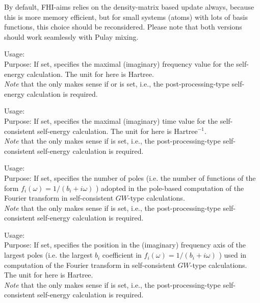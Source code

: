 By default, FHI-aims relies on the density-matrix based update always, because
this is more memory efficient, but for small systems (atoms) with lots of
basis functions, this choice should be reconsidered.  Please note that both
versions should work seamlessly with Pulay mixing.


{ \noindent
  Usage:   \\[1.0ex]
  Purpose: If set, specifies the maximal (imaginary) frequency value for the 
  self-energy calculation.  The unit for  here is Hartree.\\[1.0ex]  
}
\emph{Note} that the  only makes sense if 
 or  is set, i.e., the post-processing-type self-energy calculation 
is required.

{ \noindent
  Usage:   \\[1.0ex]
  Purpose: If set, specifies the maximal (imaginary) time value for the
  self-consistent self-energy calculation.  The unit for  here is Hartree$^{-1}$.\\[1.0ex]
}
\emph{Note} that the  only makes sense if
 is set, i.e., the post-processing-type self-consistent self-energy calculation
is required.

{ \noindent
  Usage:   \\[1.0ex]
  Purpose: If set, specifies the number of poles (i.e. the number of functions of the form 
  $f_i(\omega) = 1/(b_i +i\omega)$ ) adopted in the pole-based
  computation of the Fourier transform in self-consistent $GW$-type calculations. \\[1.0ex]
}
\emph{Note} that the  only makes sense if
 is set, i.e., the post-processing-type self-consistent self-energy calculation
is required.

{ \noindent
  Usage:   \\[1.0ex]
  Purpose: If set, specifies the position in the (imaginary) frequency axis of the 
  largest poles (i.e. the largest $b_i$ coefficient in $f_i(\omega) = 1/(b_i +i\omega)$ ) 
  used in computation of the Fourier transform in self-consistent $GW$-type calculations. 
   The unit for  here is Hartree. \\[1.0ex]
}
\emph{Note} that the  only makes sense if
 is set, i.e., the post-processing-type self-consistent self-energy calculation
is required.

